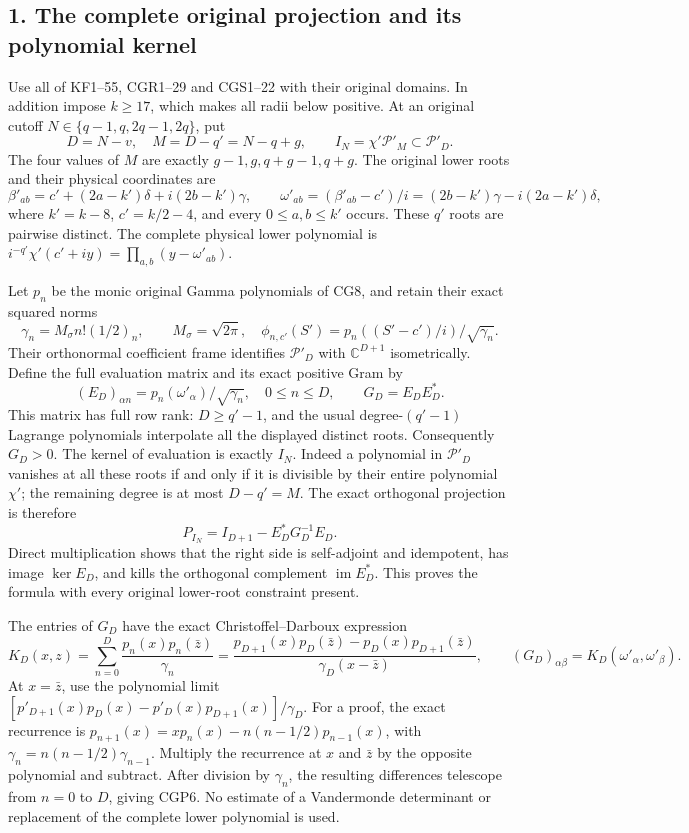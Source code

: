 \documentclass[11pt]{article}
\begin{document}
\subsection{1. The complete original projection and its polynomial kernel}\label{the-complete-original-projection-and-its-polynomial-kernel}

Use all of KF1--55, CGR1--29 and CGS1--22 with their original domains. In addition impose \(k\ge17\), which makes all radii below positive. At an original cutoff \(N\in\{q-1,q,2q-1,2q\}\), put \[
D=N-v,\quad M=D-q'=N-q+g,\qquad
I_N=\chi'\mathcal P'_{M}\subset\mathcal P'_D.
\tag{CGP1}
\] The four values of \(M\) are exactly \(g-1,g,q+g-1,q+g\). The original lower roots and their physical coordinates are \[
\beta'_{ab}=c'+(2a-k')\delta+i(2b-k')\gamma,\qquad
\omega'_{ab}=(\beta'_{ab}-c')/i
=(2b-k')\gamma-i(2a-k')\delta,
\tag{CGP2}
\] where \(k'=k-8\), \(c'=k/2-4\), and every \(0\le a,b\le k'\) occurs. These \(q'\) roots are pairwise distinct. The complete physical lower polynomial is \(i^{-q'}\chi'(c'+iy)=\prod_{a,b}(y-\omega'_{ab})\).

Let \(p_n\) be the monic original Gamma polynomials of CG8, and retain their exact squared norms \[
\gamma_n=M_\sigma n!(1/2)_n,\qquad M_\sigma=\sqrt{2\pi},
\quad \phi_{n,c'}(S')=p_n((S'-c')/i)/\sqrt{\gamma_n}.
\tag{CGP3}
\] Their orthonormal coefficient frame identifies \(\mathcal P'_D\) with \(\mathbb C^{D+1}\) isometrically. Define the full evaluation matrix and its exact positive Gram by \[
(E_D)_{\alpha n}=p_n(\omega'_\alpha)/\sqrt{\gamma_n},
\quad 0\le n\le D,\qquad G_D=E_DE_D^*.
\tag{CGP4}
\] This matrix has full row rank: \(D\ge q'-1\), and the usual degree-\((q'-1)\) Lagrange polynomials interpolate all the displayed distinct roots. Consequently \(G_D>0\). The kernel of evaluation is exactly \(I_N\). Indeed a polynomial in \(\mathcal P'_D\) vanishes at all these roots if and only if it is divisible by their entire polynomial \(\chi'\); the remaining degree is at most \(D-q'=M\). The exact orthogonal projection is therefore \[
\boxed{P_{I_N}=I_{D+1}-E_D^*G_D^{-1}E_D.}
\tag{CGP5}
\] Direct multiplication shows that the right side is self-adjoint and idempotent, has image \(\ker E_D\), and kills the orthogonal complement \(\operatorname{im}E_D^*\). This proves the formula with every original lower-root constraint present.

The entries of \(G_D\) have the exact Christoffel--Darboux expression \[
K_D(x,z)=\sum_{n=0}^D\frac{p_n(x)p_n(\bar z)}{\gamma_n}
=\frac{p_{D+1}(x)p_D(\bar z)-p_D(x)p_{D+1}(\bar z)}
{\gamma_D(x-\bar z)},\qquad
(G_D)_{\alpha\beta}=K_D(\omega'_\alpha,\omega'_\beta).
\tag{CGP6}
\] At \(x=\bar z\), use the polynomial limit \([p'_{D+1}(x)p_D(x)-p'_D(x)p_{D+1}(x)]/\gamma_D\). For a proof, the exact recurrence is \(p_{n+1}(x)=xp_n(x)-n(n-1/2)p_{n-1}(x)\), with \(\gamma_n=n(n-1/2)\gamma_{n-1}\). Multiply the recurrence at \(x\) and \(\bar z\) by the opposite polynomial and subtract. After division by \(\gamma_n\), the resulting differences telescope from \(n=0\) to \(D\), giving CGP6. No estimate of a Vandermonde determinant or replacement of the complete lower polynomial is used.
\end{document}
